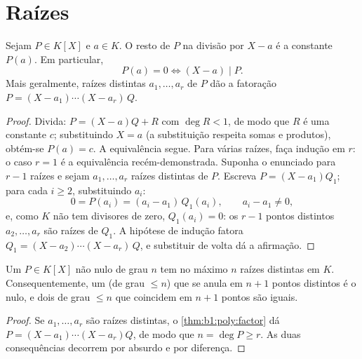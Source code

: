 \section{Raízes}

\begin{theorem}\label{thm:b1:poly:factor}
Sejam $P \in K[X]$ e $a \in K$. O resto de $P$ na divisão por
$X - a$ é a constante $P(a)$. Em particular,
\[
P(a) = 0 \iff (X - a) \mid P .
\]
Mais geralmente, raízes distintas $a_1, \dots, a_r$ de $P$ dão a
fatoração $P = (X - a_1)\cdots(X - a_r)\, Q$.
\end{theorem}

\begin{proof}
Divida: $P = (X - a) Q + R$ com $\deg R < 1$, de modo que $R$ é uma constante
$c$; substituindo $X = a$ (a substituição respeita somas e produtos),
obtém-se $P(a) = c$. A equivalência segue. Para várias raízes,
faça indução em $r$: o caso $r = 1$ é a equivalência recém-demonstrada.
Suponha o enunciado para $r - 1$ raízes e sejam $a_1, \dots, a_r$
raízes distintas de $P$. Escreva $P = (X - a_1)Q_1$; para cada $i
\geq 2$, substituindo $a_i$:
\[
0 = P(a_i) = (a_i - a_1)\,Q_1(a_i),
\qquad a_i - a_1 \neq 0 ,
\]
e, como $K$ não tem divisores de zero, $Q_1(a_i) = 0$: os $r - 1$
pontos distintos $a_2, \dots, a_r$ são raízes de $Q_1$. A
hipótese de indução fatora $Q_1 = (X - a_2)\cdots(X - a_r)\,Q$,
e substituir de volta dá a afirmação.
\end{proof}

\begin{corollary}\label{cor:b1:poly:nroots}
Um $P \in K[X]$ não nulo de grau $n$ tem no máximo $n$ raízes distintas
em $K$. Consequentemente, um  (de grau $\leq n$) que se anula em
$n + 1$ pontos distintos é o  nulo, e dois 
de grau $\leq n$ que coincidem em $n+1$ pontos são iguais.
\end{corollary}

\begin{proof}
Se $a_1, \dots, a_r$ são raízes distintas, o \cref{thm:b1:poly:factor}
dá $P = (X-a_1)\cdots(X-a_r) Q$, de modo que $n = \deg P \geq r$. As duas
consequências decorrem por absurdo e por diferença.
\end{proof}

